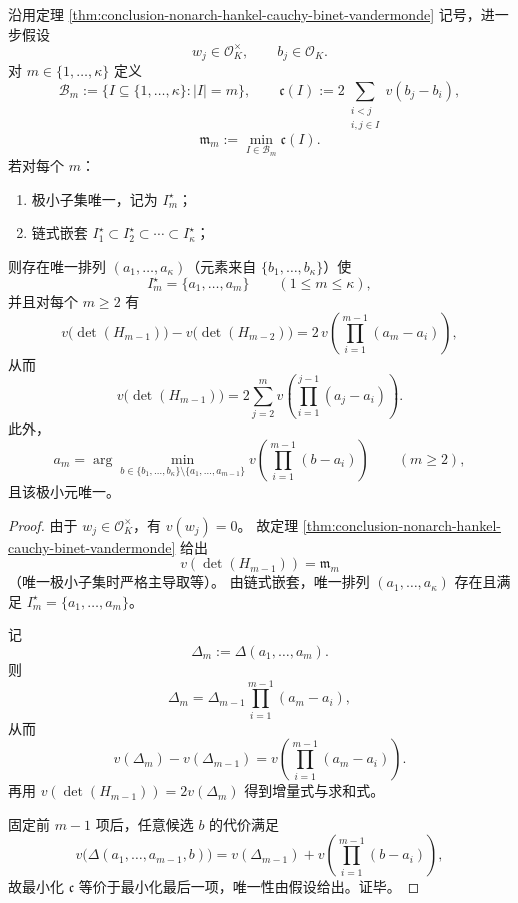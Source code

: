 \begin{theorem}\label{thm:conclusion-nonarch-hankel-tropical-chain-increment}
沿用定理 \ref{thm:conclusion-nonarch-hankel-cauchy-binet-vandermonde} 记号，进一步假设
\[
w_j\in\mathcal O_K^\times,\qquad b_j\in\mathcal O_K.
\]
对 \(m\in\{1,\dots,\kappa\}\) 定义
\[
\mathcal B_m:=\{I\subseteq\{1,\dots,\kappa\}:|I|=m\},
\qquad
\mathfrak c(I):=2\!\!\sum_{\substack{i<j\\ i,j\in I}}v(b_j-b_i),
\]
\[
\mathfrak m_m:=\min_{I\in\mathcal B_m}\mathfrak c(I).
\]
若对每个 \(m\)：
\begin{enumerate}
  \item 极小子集唯一，记为 \(I_m^\star\)；
  \item 链式嵌套 \(I_1^\star\subset I_2^\star\subset\cdots\subset I_\kappa^\star\)；
\end{enumerate}
则存在唯一排列 \((a_1,\dots,a_\kappa)\)（元素来自 \(\{b_1,\dots,b_\kappa\}\)）使
\[
I_m^\star=\{a_1,\dots,a_m\}\qquad(1\le m\le \kappa),
\]
并且对每个 \(m\ge 2\) 有
\[
v\!\bigl(\det(H_{m-1})\bigr)-v\!\bigl(\det(H_{m-2})\bigr)
=
2\,v\!\left(\prod_{i=1}^{m-1}(a_m-a_i)\right),
\]
从而
\[
v\!\bigl(\det(H_{m-1})\bigr)
=
2\sum_{j=2}^{m}
v\!\left(\prod_{i=1}^{j-1}(a_j-a_i)\right).
\]
此外，
\[
a_m=
\arg\min_{b\in\{b_1,\dots,b_\kappa\}\setminus\{a_1,\dots,a_{m-1}\}}
v\!\left(\prod_{i=1}^{m-1}(b-a_i)\right)
\qquad(m\ge 2),
\]
且该极小元唯一。
\end{theorem}
\begin{proof}
由于 \(w_j\in\mathcal O_K^\times\)，有 \(v(w_j)=0\)。
故定理 \ref{thm:conclusion-nonarch-hankel-cauchy-binet-vandermonde} 给出
\[
v(\det(H_{m-1}))=\mathfrak m_m
\]
（唯一极小子集时严格主导取等）。
由链式嵌套，唯一排列 \((a_1,\dots,a_\kappa)\) 存在且满足 \(I_m^\star=\{a_1,\dots,a_m\}\)。

记
\[
\Delta_m:=\Delta(a_1,\dots,a_m).
\]
则
\[
\Delta_m=\Delta_{m-1}\prod_{i=1}^{m-1}(a_m-a_i),
\]
从而
\[
v(\Delta_m)-v(\Delta_{m-1})
=
v\!\left(\prod_{i=1}^{m-1}(a_m-a_i)\right).
\]
再用
\(
v(\det(H_{m-1}))=2v(\Delta_m)
\)
得到增量式与求和式。

固定前 \(m-1\) 项后，任意候选 \(b\) 的代价满足
\[
v\!\bigl(\Delta(a_1,\dots,a_{m-1},b)\bigr)
=
v(\Delta_{m-1})
+
v\!\left(\prod_{i=1}^{m-1}(b-a_i)\right),
\]
故最小化 \(\mathfrak c\) 等价于最小化最后一项，唯一性由假设给出。证毕。
\end{proof}

